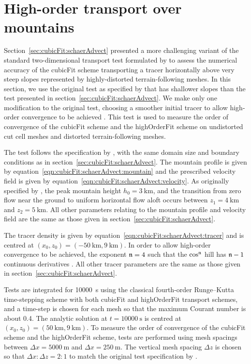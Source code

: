 \section{High-order transport over mountains}
\label{sec:highOrderFit:schaerAdvectSmooth}

Section~\ref{sec:cubicFit:schaerAdvect} presented a more challenging variant of the standard two-dimensional transport test formulated by \citet{schaer2002} to assess the numerical accuracy of the cubicFit scheme transporting a tracer horizontally above very steep slopes represented by highly-distorted terrain-following meshes.
In this section, we use the original test as specified by \citet{schaer2002} that has shallower slopes than the test presented in section~\ref{sec:cubicFit:schaerAdvect}.
We make only one modification to the original test, choosing a smoother initial tracer to allow high-order convergence to be achieved \citep{holdaway2008}.
This test is used to measure the order of convergence of the cubicFit scheme and the highOrderFit scheme on undistorted cut cell meshes and distorted terrain-following meshes.

The test follows the specification by \citet{schaer2002}, with the same domain size and boundary conditions as in section~\ref{sec:cubicFit:schaerAdvect}.
The mountain profile is given by equation~\eqref{eqn:cubicFit:schaerAdvect:mountain} and the prescribed velocity field is given by equation~\eqref{eqn:cubicFit:schaerAdvect:velocity}.
As originally specified by \citet{schaer2002}, the peak mountain height $h_0 = \SI{3}{\kilo\meter}$, and the transition from zero flow near the ground to uniform horizontal flow aloft occurs between $z_1 = \SI{4}{\kilo\meter}$ and $z_2 = \SI{5}{\kilo\meter}$.
All other parameters relating to the mountain profile and velocity field are the same as those given in section~\ref{sec:cubicFit:schaerAdvect}.

The tracer density is given by equation~\eqref{eqn:cubicFit:schaerAdvect:tracer} and is centred at $(x_0, z_0) = (\SI{-50}{\kilo\meter}, \SI{9}{\kilo\meter})$.  In order to allow high-order convergence to be achieved, the exponent $\mathfrak{n} = 4$ such that the $\cos^{\mathfrak{n}}$ hill has $\mathfrak{n} - 1$ continuous derivatives \citep{holdaway2008}.
All other tracer parameters are the same as those given in section~\ref{sec:cubicFit:schaerAdvect}.

Tests are integrated for \SI{10000}{\second} using the classical fourth-order Runge–Kutta time-stepping scheme with both cubicFit and highOrderFit transport schemes, and a time-step is chosen for each mesh so that the maximum Courant number is about \num{0.4}.  
The analytic solution at $t = \SI{10000}{\second}$ is centred at $(x_0, z_0) = (\SI{50}{\kilo\meter}, \SI{9}{\kilo\meter})$.
To measure the order of convergence of the cubicFit scheme and the highOrderFit scheme, tests are performed using mesh spacings between $\Delta x = \SI{5000}{\meter}$ and $\Delta x = \SI{250}{\meter}$.
The vertical mesh spacing $\Delta z$ is chosen so that $\Delta x \mathbin{:} \Delta z = 2\mathbin{:}1$ to match the original test specification by \citet{schaer2002}.

